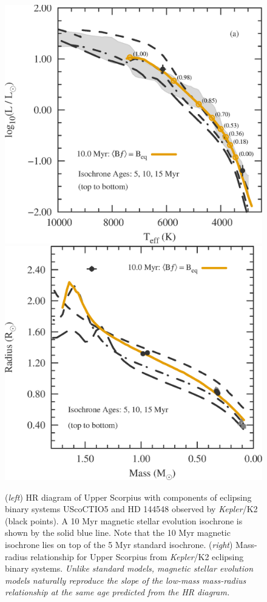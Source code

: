 \begin{figure}
	\centering
    \includegraphics[scale=0.35]{fig/USco_HR_diagram.eps} \quad
    \includegraphics[scale=0.35]{fig/USco_MR_diagram.eps}
    \caption{({\it left}) HR diagram of Upper Scorpius with components of eclipsing binary systems UScoCTIO5 \citep{Kraus2015} and HD 144548 \citep{Alonso2015}
    observed by {\it Kepler}/K2 (black points). A 10 Myr magnetic stellar evolution isochrone is shown by the solid blue line. Note that the 10 Myr magnetic isochrone lies on top of the 5 Myr standard isochrone. ({\it right}) Mass-radius relationship for Upper Scorpius from {\it Kepler}/K2 eclipsing binary systems. {\it Unlike standard models, magnetic stellar evolution models naturally reproduce the slope of the low-mass mass-radius relationship at the same age predicted from the HR diagram.}}
    \label{fig:usco}
\end{figure}

